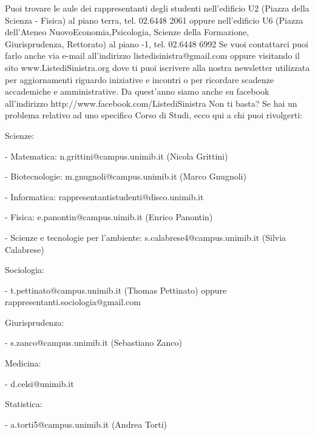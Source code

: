 Puoi trovare le aule dei rappresentanti degli studenti  nell'edificio U2 (Piazza della Scienza - Fisica) al piano terra, tel. 02.6448 2061 oppure nell'edificio U6 (Piazza dell'Ateneo NuovoEconomia,Psicologia, Scienze della Formazione, Giurisprudenza, Rettorato) al piano -1, tel. 02.6448 6992
Se vuoi contattarci puoi farlo anche via e-mail all’indirizzo listedisinistra@gmail.com oppure visitando il sito www.ListediSinistra.org dove ti puoi iscrivere alla nostra newsletter utilizzata per aggiornamenti riguardo iniziative e incontri o per ricordare scadenze accademiche e amministrative.
Da quest'anno siamo anche su facebook all'indirizzo http://www.facebook.com/ListediSinistra 
Non ti basta? Se hai un problema relativo ad uno specifico Corso di Studi, ecco qui a chi puoi rivolgerti:

Scienze:
   \item- Matematica: n.grittini@campus.unimib.it (Nicola Grittini)
   \item- Biotecnologie: m.gnugnoli@campus.unimib.it (Marco Gnugnoli)
   \item- Informatica: rappresentantistudenti@disco.unimib.it
   \item- Fisica: e.panontin@campus.uimib.it (Enrico Panontin)
   \item- Scienze e tecnologie per l'ambiente: s.calabrese4@campus.unimib.it (Silvia Calabrese)
   
Sociologia: 
   \item- t.pettinato@campus.unimib.it (Thomas Pettinato) oppure rappresentanti.sociologia@gmail.com

Giurisprudenza: 
   \item- s.zanco@campus.unimib.it (Sebastiano Zanco)
   
Medicina: 
   \item- d.celsi@unimib.it 
   
Statistica: 
   \item- a.torti5@campus.unimib.it (Andrea Torti)
